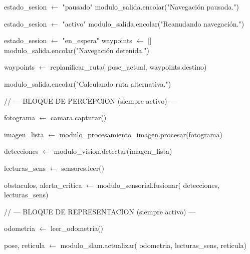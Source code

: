 \begin{algorithmic}[1]
        \State estado\_sesion $\gets$ "pausado"
        \State modulo\_salida.encolar("Navegación pausada.")

    \EndIf

    \Statex


        \State estado\_sesion $\gets$ "activo"
        \State modulo\_salida.encolar("Reanudando navegación.")

    \EndIf

    \Statex


        \State estado\_sesion $\gets$ "en\_espera"
        \State waypoints $\gets$ []
        \State modulo\_salida.encolar("Navegación detenida.")

    \EndIf

    \Statex


        \State waypoints $\gets$ replanificar\_ruta(
        \Statex \hspace{2.3cm} pose\_actual, waypoints.destino)

        \State modulo\_salida.encolar("Calculando ruta alternativa.")

    \EndIf

\EndIf

\Statex
\Statex \hspace{0.5cm} // --- BLOQUE DE PERCEPCION (siempre activo) ---

\State fotograma $\gets$ camara.capturar()

\State imagen\_lista $\gets$
modulo\_procesamiento\_imagen.procesar(fotograma)

\State detecciones $\gets$ modulo\_vision.detectar(imagen\_lista)

\State lecturas\_sens $\gets$ sensores.leer()

\State obstaculos, alerta\_critica $\gets$
modulo\_sensorial.fusionar(
\Statex \hspace{2.3cm} detecciones, lecturas\_sens)

\Statex
\Statex \hspace{0.5cm} // --- BLOQUE DE REPRESENTACION (siempre activo) ---

\State odometria $\gets$ leer\_odometria()

\State pose, reticula $\gets$ modulo\_slam.actualizar(
\Statex \hspace{2.3cm} odometria, lecturas\_sens, reticula)


\end{algorithmic}
